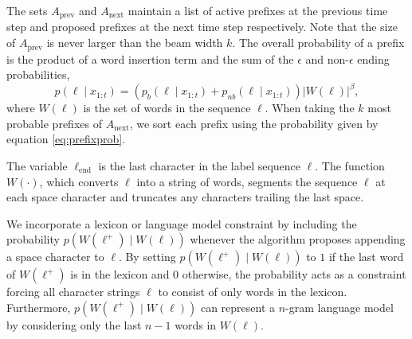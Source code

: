 The sets $A_{\text{prev}}$ and $A_{\text{next}}$ maintain a list of active
prefixes at the previous time step and proposed prefixes at the next time step
respectively. Note that the size of $A_{\text{prev}}$ is never larger than the
beam width $k$. The overall probability of a prefix is the product of a word
insertion term and the sum of the $\epsilon$ and non-$\epsilon$ ending probabilities,
\begin{equation}\label{eq:prefixprob}
  p(\ell \mid x_{1:t}) = (p_b(\ell \mid x_{1:t}) + p_{nb}(\ell \mid x_{1:t})) |W(\ell)|^\beta,
\end{equation}
where $W(\ell)$ is the set of words in the sequence $\ell$. When taking the $k$
most probable prefixes of $A_{\text{next}}$, we sort each prefix using the
probability given by equation \ref{eq:prefixprob}.

The variable $\ell_{\text{end}}$ is the last character in the label sequence
$\ell$. The function $W(\cdot)$, which converts $\ell$ into a string of words,
segments the sequence $\ell$ at each space character and truncates any
characters trailing the last space. 

We incorporate a lexicon or language model constraint by including the
probability $p(W(\ell^+) \mid W(\ell))$ whenever the algorithm proposes
appending a space character to $\ell$. By setting $p(W(\ell^+) \mid W(\ell))$
to $1$ if the last word of $W(\ell^+)$ is in the lexicon and $0$ otherwise, the
probability acts as a constraint forcing all character strings $\ell$ to
consist of only words in the lexicon.  Furthermore, $p(W(\ell^+) \mid W(\ell))$
can represent a $n$-gram language model by considering only the last $n-1$
words in $W(\ell)$.  

